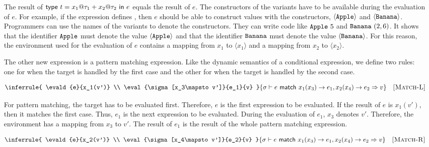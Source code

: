 The result of $\textsf{type}\ t=x_1@\tau_1+x_2@\tau_2\ \textsf{in}\ e$ equals the
result of $e$. The constructors of the variants have to be available during
the evaluation of $e$. For example, if the expression defines , then
$e$ should be able to construct values with the constructors,
$\langle\texttt{Apple}\rangle$ and $\langle\texttt{Banana}\rangle$. Programmers can
use the names of the variants to denote the constructors. They can
write code like $\texttt{Apple}\ 5$ and $\texttt{Banana}\ (2,6)$. It shows that
the identifier $\texttt{Apple}$ must denote the value $\langle\texttt{Apple}\rangle$ and
that the identifier $\texttt{Banana}$ must denote the value
$\langle\texttt{Banana}\rangle$. For this reason, the environment used for the
evaluation of $e$ contains a mapping from $x_1$ to $\langle x_1\rangle$ and
a mapping from $x_2$ to $\langle x_2\rangle$.

The other new expression is a pattern matching expression. Like the dynamic
semantics of a conditional expression, we define two rules: one for when the
target is handled by the first case and the other for when the target is handled
by the second case.


\vspace{-1em}

\[
  \inferrule
  { \evald{e}{x_1(v')} \\
    \eval{\sigma[x_3\mapsto v']}{e_1}{v} }
  { \evald{\ematch{e}{x_1}{x_3}{e_1}{x_2}{x_4}{e_2}}{v} }
  \quad\textsc{[Match-L]}
\]

For pattern matching, the target has to be evaluated first. Therefore, $e$
is the first expression to be evaluated. If the result of $e$ is $x_1(v')$, then
it matches the first case. Thus, $e_1$ is the next expression to be evaluated.
During the evaluation of $e_1$, $x_3$ denotes $v'$. Therefore, the
environment has a mapping from $x_3$ to $v'$. The result of $e_1$ is the result
of the whole pattern matching expression.


\vspace{-1em}

\[
  \inferrule
  { \evald{e}{x_2(v')} \\
    \eval{\sigma[x_4\mapsto v']}{e_2}{v} }
  { \evald{\ematch{e}{x_1}{x_3}{e_1}{x_2}{x_4}{e_2}}{v} }
  \quad\textsc{[Match-R]}
\]

